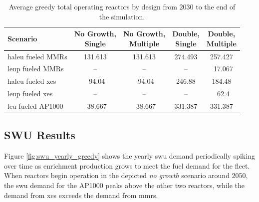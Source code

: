 \begin{table}[H]
  \centering
  \caption{Average greedy total operating reactors by design from 2030 to the end of the simulation.}
  \label{tab:greedy_reac_avg}
  \begin{tabular}{l c c c c}
    \toprule
    Scenario & \shortstack{No Growth,\\ Single} & \shortstack{No Growth,\\ Multiple} & \shortstack{Double,\\ Single} & \shortstack{Double,\\ Multiple}  \\
    \midrule
     \gls{haleu} fueled MMRs      & 131.613 & 131.613 & 274.493 & 257.427 \\
     \gls{leup} fueled MMRs       & --      & --      & --      & \textcolor{white}{0}17.067 \\
     \gls{haleu} fueled \gls{xe}s & \textcolor{white}{0}94.04   & \textcolor{white}{0}94.04   & 246.88  & 184.48 \\
     \gls{leup} fueled \gls{xe}s  & --      & --      & --      & \textcolor{white}{0}62.4 \\
     \gls{leu} fueled AP1000      & \textcolor{white}{0}38.667  & \textcolor{white}{0}38.667  & 331.387 & 331.387 \\
     \bottomrule
  \end{tabular}
\end{table}




\subsection{SWU Results}
\label{sec:greedy_swu}

Figure \ref{fig:swu_yearly_greedy} shows the yearly \gls{swu} demand periodically spiking over time as enrichment production grows to meet the fuel demand for the fleet. When reactors begin operation in the depicted \textit{no growth} scenario around 2050, the \gls{swu} demand for the AP1000 peaks above the other two reactors, while the demand from \glspl{xe} exceeds the demand from \glspl{mmr}.



